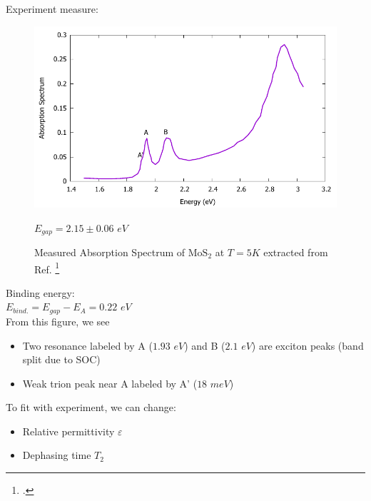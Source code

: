 \documentclass{beamer}
\begin{document}
\begin{frame}
	Experiment measure:
	\begin{multicols}{2}
		\begin{figure}
			\includegraphics[width = 1\linewidth]{images/Experiment.pdf}
			\caption{Measured Absorption Spectrum of $\mathrm{MoS}_2$ at $T=5K$  extracted from Ref.  \footcite{zhang_absorption_2014}} $E_{gap} = 2.15 \pm 0.06$ \(eV\)
		\end{figure}
		Binding energy: \\
		$E_{bind.} = E_{gap} - E_{A} = 0.22$ \(eV\)
		\columnbreak\\
From this figure, we see
		\begin{itemize}
			\item Two resonance labeled by A ($1.93$ \(eV\)) and B ($2.1$ \(eV\)) are exciton peaks (band split due to SOC)
			\item Weak trion peak near A labeled by A' ($18$ \(meV\))
		\end{itemize}
		To fit with experiment, we can change:
		\begin{itemize}
			\item Relative permittivity $\varepsilon$
			\item Dephasing time $T_2$
		\end{itemize}
	\end{multicols}
\end{frame}
\end{document}
